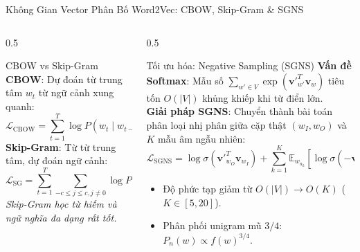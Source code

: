 \documentclass[aspectratio=169, 10pt]{beamer}
\begin{document}
\begin{frame}{Không Gian Vector Phân Bố Word2Vec: CBOW, Skip-Gram \& SGNS}
  \begin{columns}[c]
    \begin{column}{0.5\textwidth}
      \begin{block}{CBOW vs Skip-Gram}
        \fontsize{7.5}{9.5}\selectfont
        \textbf{CBOW}: Dự đoán từ trung tâm $w_t$ từ ngữ cảnh xung quanh:
        \vspace{-0.15cm}
        $$\mathcal{L}_{\text{CBOW}} = \sum_{t=1}^T \log P(w_t \mid w_{t-c}, \dots, w_{t+c})$$
        \vspace{-0.15cm}
        \textbf{Skip-Gram}: Từ từ trung tâm, dự đoán ngữ cảnh:
        \vspace{-0.15cm}
        $$\mathcal{L}_{\text{SG}} = \sum_{t=1}^T \sum_{-c \le j \le c, j \ne 0} \log P(w_{t+j} \mid w_t)$$
        \textit{Skip-Gram học từ hiếm và ngữ nghĩa đa dạng rất tốt.}
      \end{block}
    \end{column}

    \begin{column}{0.5\textwidth}
      \begin{alertblock}{Tối ưu hóa: Negative Sampling (SGNS)}
        \fontsize{7.5}{9.5}\selectfont
        \textbf{Vấn đề Softmax}: Mẫu số $\sum_{w' \in V} \exp(\mathbf{v}'^T_{w'} \mathbf{v}_w)$ tiêu tốn $O(|V|)$ khủng khiếp khi từ điển lớn.\\
        \textbf{Giải pháp SGNS}: Chuyển thành bài toán phân loại nhị phân giữa cặp thật $(w_I, w_O)$ và $K$ mẫu âm ngẫu nhiên:
        \vspace{-0.15cm}
        $$\mathcal{L}_{\text{SGNS}} = \log \sigma(\mathbf{v}'^T_{w_O} \mathbf{v}_{w_I}) + \sum_{k=1}^K \mathbb{E}_{w_{n_k}} \left[ \log \sigma(-\mathbf{v}'^T_{w_{n_k}} \mathbf{v}_{w_I}) \right]$$
        \begin{itemize}
          \item Độ phức tạp giảm từ $O(|V|) \to O(K)$ ($K \in [5, 20]$).
          \item Phân phối unigram mũ $3/4$: $P_n(w) \propto f(w)^{3/4}$.
        \end{itemize}
      \end{alertblock}
    \end{column}
  \end{columns}
\end{frame}
\end{document}
